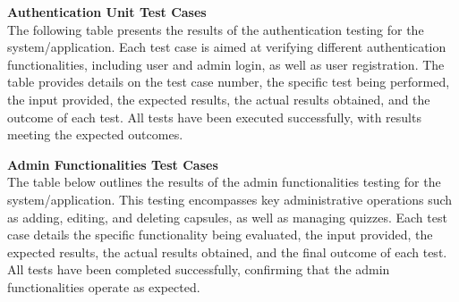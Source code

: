 \vspace{-1em}
\textbf{Authentication Unit Test Cases}\\
The following table presents the results of the authentication testing for the system/application. Each test case is aimed at verifying different authentication functionalities, including user and admin login, as well as user registration. The table provides details on the test case number, the specific test being performed, the input provided, the expected results, the actual results obtained, and the outcome of each test. All tests have been executed successfully, with results meeting the expected outcomes.
\begin{table}[H]
    \caption{Authentication Unit Test Cases}
\end{table}
\vspace{-1em}
\textbf{Admin Functionalities  Test Cases}\\
The table below outlines the results of the admin functionalities testing for the system/application. This testing encompasses key administrative operations such as adding, editing, and deleting capsules, as well as managing quizzes. Each test case details the specific functionality being evaluated, the input provided, the expected results, the actual results obtained, and the final outcome of each test. All tests have been completed successfully, confirming that the admin functionalities operate as expected.

